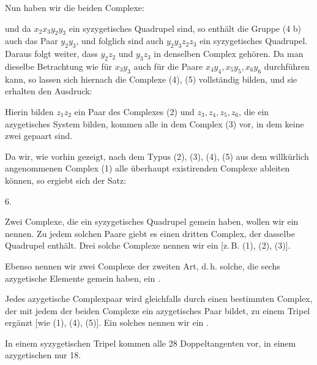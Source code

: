 Nun haben wir die beiden Complexe:


und da $x_2 x_3 y_2 y_3$ ein syzygetisches Quadrupel sind, so enthält die Gruppe (4 b) auch das Paar $y_2 y_3$, und folglich sind auch $y_2 y_3 z_2 z_3$ ein syzygetisches Quadrupel. Daraus folgt weiter, dass $y_2 z_2$ und $y_3 z_3$ in denselben Complex gehören. Da man dieselbe Betrachtung wie für $x_3 y_3$ auch für die Paare $x_4 y_4, x_5 y_5, x_6 y_6$ durchführen kann, so lassen sich hiernach die Complexe (4), (5) vollständig bilden, und sie erhalten den Ausdruck:


Hierin bilden $z_1 z_2$ ein Paar des Complexes (2) und $z_3, z_4, z_5, z_6$, die ein azygetisches System bilden, kommen alle in dem Complex (3) vor, in dem keine zwei gepaart sind.

Da wir, wie vorhin gezeigt, nach dem Typus (2), (3), (4), (5) aus dem willkürlich angenommenen Complex (1) alle überhaupt existirenden Complexe ableiten können, so ergiebt sich der Satz:

6. 

Zwei Complexe, die ein syzygetisches Quadrupel gemein haben, wollen wir ein  nennen. Zu jedem solchen Paare giebt es einen dritten Complex, der dasselbe Quadrupel enthält. Drei solche Complexe nennen wir ein  [z.\,B. (1), (2), (3)].

Ebenso nennen wir zwei Complexe der zweiten Art, d.\,h. solche, die sechs azygetische Elemente gemein haben, ein .

Jedes azygetische Complexpaar wird gleichfalls durch einen bestimmten Complex, der mit jedem der beiden Complexe ein azygetisches Paar bildet, zu einem Tripel ergänzt [wie (1), (4), (5)]. Ein solches nennen wir ein .

In einem syzygetischen Tripel kommen alle 28 Doppeltangenten vor, in einem azygetischen nur 18.
